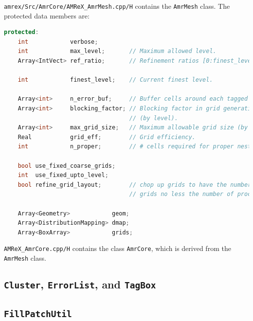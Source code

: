 {\tt amrex/Src/AmrCore/AMReX\_AmrMesh.cpp/H} contains the {\tt AmrMesh} class.
The protected data members are:
\begin{lstlisting}[language=cpp]
protected:
    int            verbose;
    int            max_level;       // Maximum allowed level.
    Array<IntVect> ref_ratio;       // Refinement ratios [0:finest_level-1]

    int            finest_level;    // Current finest level.

    Array<int>     n_error_buf;     // Buffer cells around each tagged cell.
    Array<int>     blocking_factor; // Blocking factor in grid generation 
                                    // (by level).
    Array<int>     max_grid_size;   // Maximum allowable grid size (by level).
    Real           grid_eff;        // Grid efficiency.
    int            n_proper;        // # cells required for proper nesting.

    bool use_fixed_coarse_grids;
    int  use_fixed_upto_level;
    bool refine_grid_layout;        // chop up grids to have the number of 
                                    // grids no less the number of procs

    Array<Geometry>            geom;
    Array<DistributionMapping> dmap;
    Array<BoxArray>            grids;    
\end{lstlisting}

{\tt AMReX\_AmrCore.cpp/H} contains the class {\tt AmrCore}, which is derived from
the {\tt AmrMesh} class.

\subsection{{\tt Cluster}, {\tt ErrorList}, and {\tt TagBox}}

\subsection{{\tt FillPatchUtil}}\label{sec:amrcore:fillpatch}

